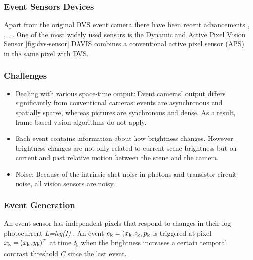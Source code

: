\documentclass[12pt]{report}
\begin{document}
\subsubsection{Event Sensors Devices}
Apart from the original DVS event camera \cite{Lichtsteiner2008} there have been recent advancements \cite{posch2014} , \cite{liu2015}, \cite{indiveri2015}, \cite{delbruck2010} .
One of the most widely used sensors is the Dynamic and Active Pixel Vision Sensor \cite{davis} \ref{fig:dvs-sensor}.DAVIS combines a conventional active pixel sensor (APS) \cite{fossum1997} in the same pixel with DVS.   
\subsubsection{Challenges}
\begin{itemize}
    \item Dealing with various space-time output: Event cameras' output differs significantly from conventional cameras: events are asynchronous and spatially sparse, whereas pictures are synchronous and dense. As a result, frame-based vision algorithms do not apply.
    \item Each event contains information about how brightness changes. However, brightness changes are not only related to current scene brightness but on current and past relative motion between the scene and the camera.
    \item Noise: Because of the intrinsic shot noise in photons and transistor circuit noise, all vision sensors are noisy.
\end{itemize}
\subsubsection{Event Generation}
An event sensor \cite{Lichtsteiner2008} has independent pixels that respond
to changes in their log photocurrent \textit{L=log(I)} . An event \(e\textsubscript{k}=(x\textsubscript{k},t\textsubscript{k},p\textsubscript{k}\) is triggered at pixel \(x\textsubscript{k}=(x\textsubscript{k},y\textsubscript{k})^T\) at time \textit{t}\textsubscript{k} when the brightness increases a certain temporal contrast threshold \textit{C} since the last event.
\end{document}
